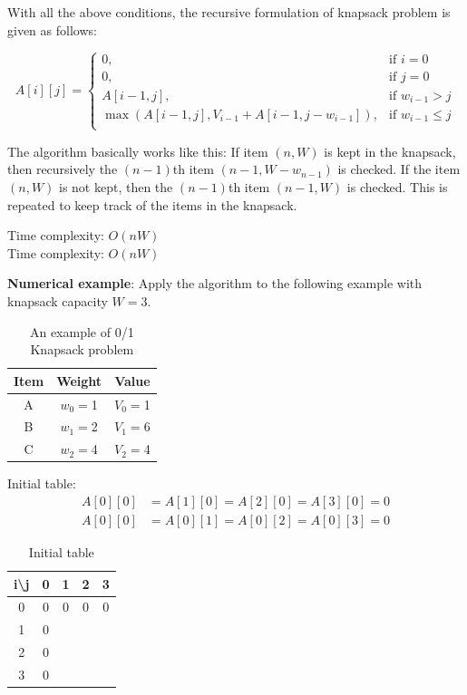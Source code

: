 \documentclass[a4paper,11pt]{book}
\begin{document}
\noindent With all the above conditions, the recursive formulation of knapsack problem is given as follows:

\[
    A[i][j]= 
\begin{cases}
    0, & \text{if } i=0\\
    0, & \text{if } j=0\\
    A[i-1,j], & \text{if } w_{i-1} > j\\
    \max(A[i-1,j], V_{i-1} + A[i-1,j-w_{i-1}]), & \text{if } w_{i-1} \leq j\\
\end{cases}
\]

\noindent The algorithm basically works like this: If item $(n,W)$ is kept in the knapsack, then recursively the $(n-1)$th item $(n-1, W-w_{n-1})$ is checked. If the item $(n,W)$ is not kept, then the $(n-1)$th item $(n-1, W)$ is checked. This is repeated to keep track of the items in the knapsack.

\vspace{5mm}

\noindent Time complexity: $O(nW)$\\
\noindent \noindent Time complexity: $O(nW)$

\vspace{3mm}

\noindent \textbf{Numerical example}: Apply the algorithm to the following example with knapsack capacity $W=3$.
\begin{table}[ht]
\centering
\begin{tabular}{|c|c|c|}
\hline
Item & Weight & Value \\ \hline
A    & $w_0=$1      & $V_0=$1     \\
B    & $w_1=$2      & $V_1=$6     \\
C    & $w_2=$4      & $V_2=$4 \\
\hline
\end{tabular}
\caption{An example of 0/1 Knapsack problem}
\end{table}

\noindent Initial table:
\begin{align*}
    A[0][0] &= A[1][0] = A[2][0] = A[3][0] = 0\\
    A[0][0] &= A[0][1] = A[0][2] = A[0][3] = 0
\end{align*}

\begin{table}[ht]
\centering
\begin{tabular}{|c|c|c|c|c|}
\hline
i\textbackslash{}j & 0 & 1 & 2 & 3 \\ \hline
0                  & 0 & 0 & 0 & 0 \\ \hline
1                  & 0 &   &   &   \\ \hline
2                  & 0 &   &   &   \\ \hline
3                  & 0 &   &   &   \\ \hline
\end{tabular}
\caption{Initial table}
\end{table}
\end{document}
